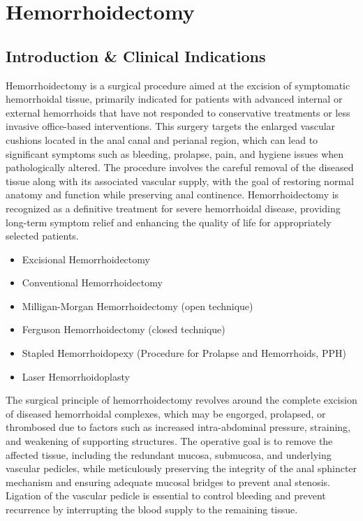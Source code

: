 \chapter{Hemorrhoidectomy}

\section*{Introduction \& Clinical Indications}
Hemorrhoidectomy is a surgical procedure aimed at the excision of symptomatic hemorrhoidal tissue, primarily indicated for patients with advanced internal or external hemorrhoids that have not responded to conservative treatments or less invasive office-based interventions. This surgery targets the enlarged vascular cushions located in the anal canal and perianal region, which can lead to significant symptoms such as bleeding, prolapse, pain, and hygiene issues when pathologically altered. The procedure involves the careful removal of the diseased tissue along with its associated vascular supply, with the goal of restoring normal anatomy and function while preserving anal continence. Hemorrhoidectomy is recognized as a definitive treatment for severe hemorrhoidal disease, providing long-term symptom relief and enhancing the quality of life for appropriately selected patients.

\begin{itemize}
  \item Excisional Hemorrhoidectomy
  \item Conventional Hemorrhoidectomy
  \item Milligan-Morgan Hemorrhoidectomy (open technique)
  \item Ferguson Hemorrhoidectomy (closed technique)
  \item Stapled Hemorrhoidopexy (Procedure for Prolapse and Hemorrhoids, PPH)
  \item Laser Hemorrhoidoplasty
\end{itemize}

The surgical principle of hemorrhoidectomy revolves around the complete excision of diseased hemorrhoidal complexes, which may be engorged, prolapsed, or thrombosed due to factors such as increased intra-abdominal pressure, straining, and weakening of supporting structures. The operative goal is to remove the affected tissue, including the redundant mucosa, submucosa, and underlying vascular pedicles, while meticulously preserving the integrity of the anal sphincter mechanism and ensuring adequate mucosal bridges to prevent anal stenosis. Ligation of the vascular pedicle is essential to control bleeding and prevent recurrence by interrupting the blood supply to the remaining tissue.

